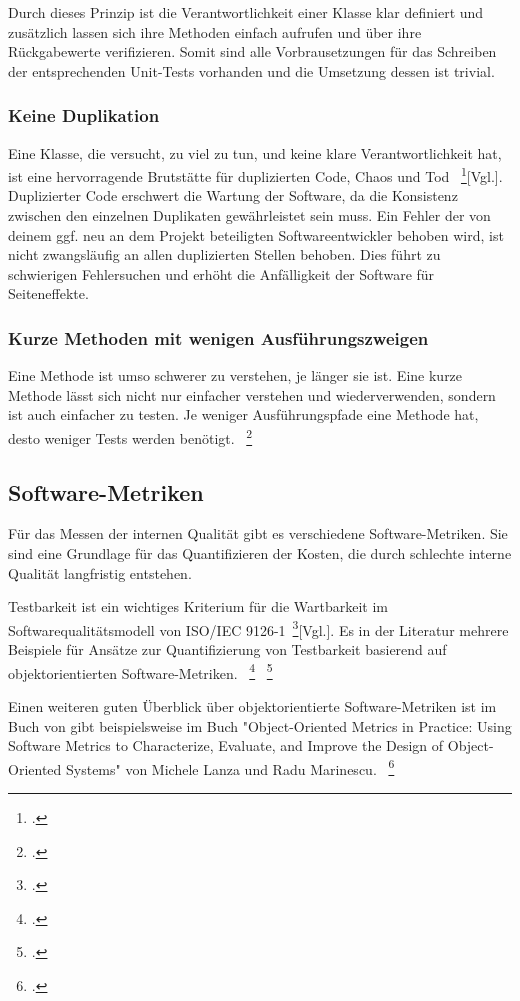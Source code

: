 Durch dieses Prinzip ist die Verantwortlichkeit einer Klasse klar definiert und zusätzlich lassen sich ihre Methoden einfach
aufrufen und über ihre Rückgabewerte verifizieren. Somit sind alle Vorbrausetzungen für das Schreiben der entsprechenden 
Unit-Tests vorhanden und die Umsetzung dessen ist trivial.

\subsubsection{Keine Duplikation}
Eine Klasse, die versucht, zu viel zu tun, und keine klare Verantwortlichkeit hat, ist eine
hervorragende Brutstätte für duplizierten Code, Chaos und Tod ~\footcite{Fowler.2000}[Vgl.]. Duplizierter
Code erschwert die Wartung der Software, da die Konsistenz zwischen den einzelnen Duplikaten gewährleistet 
sein muss. Ein Fehler der von deinem ggf. neu an dem Projekt beteiligten Softwareentwickler behoben wird, 
ist nicht zwangsläufig an allen duplizierten Stellen behoben. Dies führt zu schwierigen Fehlersuchen und 
erhöht die Anfälligkeit der Software für Seiteneffekte. 

\subsubsection{Kurze Methoden mit wenigen Ausführungszweigen}
Eine Methode ist umso schwerer zu verstehen, je länger sie ist. Eine kurze Methode lässt
sich nicht nur einfacher verstehen und wiederverwenden, sondern ist auch einfacher zu
testen. Je weniger Ausführungspfade eine Methode hat, desto weniger Tests werden benötigt. ~\footcite[Vgl. Seite 9]{Bergmann.2013}

\subsection{Software-Metriken}
Für das Messen der internen Qualität gibt es verschiedene Software-Metriken. Sie sind eine
Grundlage für das Quantifizieren der Kosten, die durch schlechte interne Qualität langfristig entstehen.

Testbarkeit ist ein wichtiges Kriterium für die Wartbarkeit im Softwarequalitätsmodell von ISO/IEC 9126-1~\footcite{ISOIEC91261}[Vgl.]. Es in der Literatur mehrere Beispiele für Ansätze zur Quantifizierung von Testbarkeit basierend auf objektorientierten Software-Metriken. ~\footcite[Vgl. Seite 136-145]{Bruntink.2004} ~\footcite[Vgl. Seite 1 - 6]{Khan.2009}

Einen weiteren guten Überblick über objektorientierte Software-Metriken ist im Buch von gibt beispielsweise im Buch "Object-Oriented Metrics in Practice: Using Software Metrics to Characterize, Evaluate, and Improve the Design of Object-Oriented Systems" von Michele Lanza und Radu Marinescu. ~\footcite[Vgl.]{Lanza.2006}

